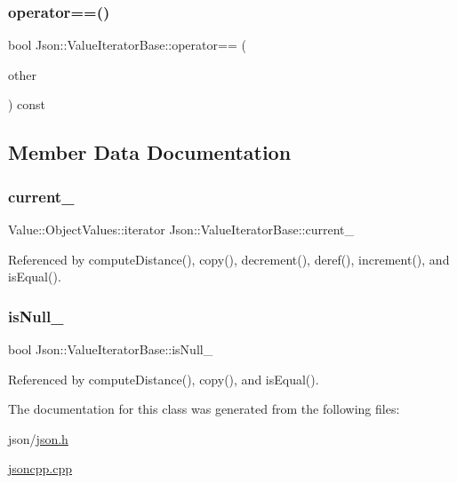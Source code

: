 \subsubsection{\texorpdfstring{operator==()}{operator==()}}
{\footnotesize\ttfamily bool Json\+::\+Value\+Iterator\+Base\+::operator== (\begin{DoxyParamCaption}\item[{const \hyperlink{classJson_1_1ValueIteratorBase_a9d2a940d03ea06d20d972f41a89149ee_a9d2a940d03ea06d20d972f41a89149ee}{Self\+Type} \&}]{other }\end{DoxyParamCaption}) const\hspace{0.3cm}{\ttfamily [inline]}}



\subsection{Member Data Documentation}
\mbox{\label{classJson_1_1ValueIteratorBase_ab3138ce8af8301cca3b041ea55cb922a_ab3138ce8af8301cca3b041ea55cb922a}} 
\subsubsection{\texorpdfstring{current\+\_\+}{current\_}}
{\footnotesize\ttfamily Value\+::\+Object\+Values\+::iterator Json\+::\+Value\+Iterator\+Base\+::current\+\_\+\hspace{0.3cm}{\ttfamily [private]}}



Referenced by compute\+Distance(), copy(), decrement(), deref(), increment(), and is\+Equal().

\mbox{\label{classJson_1_1ValueIteratorBase_a3e08b114a1aed9bde518c527f94a8c59_a3e08b114a1aed9bde518c527f94a8c59}} 
\subsubsection{\texorpdfstring{is\+Null\+\_\+}{isNull\_}}
{\footnotesize\ttfamily bool Json\+::\+Value\+Iterator\+Base\+::is\+Null\+\_\+\hspace{0.3cm}{\ttfamily [private]}}



Referenced by compute\+Distance(), copy(), and is\+Equal().



The documentation for this class was generated from the following files\+:\begin{DoxyCompactItemize}
\item 
json/\hyperlink{json_8h}{json.\+h}\item 
\hyperlink{jsoncpp_8cpp}{jsoncpp.\+cpp}\end{DoxyCompactItemize}
